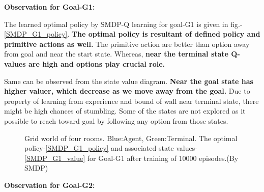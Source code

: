 \documentclass[preprint,12pt]{elsarticle}
\begin{document}
\textbf{Observation for Goal-G1:}

The learned optimal policy by SMDP-Q learning for goal-G1 is given in fig.-\ref{SMDP_G1_policy}. \textbf{The optimal policy is resultant of defined policy and primitive actions as well.} The primitive action are better than option away from goal and near the start state. Whereas, \textbf{near the terminal state Q-values are high and options play crucial role.}

Same can be observed from the state value diagram. \textbf{Near the goal state has higher valuer, which decrease as we move away from the goal.} Due to property of learning from experience and bound of wall near terminal state, there might be high chances of stumbling.  Some of the states are not explored as it possible to reach toward goal by following any option from those states. 

\begin{figure}[H]
	\centering  
	\caption{Grid world of four rooms.  Blue:Agent, Green:Terminal. The optimal policy-\ref{SMDP_G1_policy} and associated state values-\ref{SMDP_G1_value} for Goal-G1 after training of 10000 episodes.(By SMDP)}
	\label{fig:SMDP_G1}
\end{figure}

\newpage

\textbf{Observation for Goal-G2:}
\end{document}
